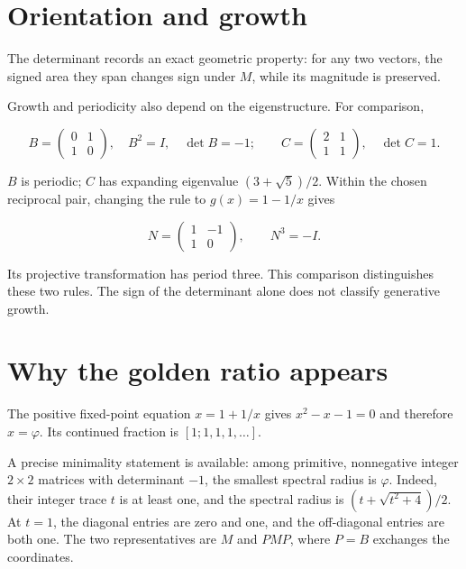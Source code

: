 \documentclass[10pt,a4paper]{article}
\begin{document}
\section*{Orientation and growth}

The determinant records an exact geometric property: for any two vectors, the signed area they span changes sign under $M$, while its magnitude is preserved.
\par

Growth and periodicity also depend on the eigenstructure. For comparison,
\par

\[
B=\begin{pmatrix}0&1\\1&0\end{pmatrix},\quad B^2=I,\quad \det B=-1;\qquad C=\begin{pmatrix}2&1\\1&1\end{pmatrix},\quad \det C=1.
\]

$B$ is periodic; $C$ has expanding eigenvalue $(3+\sqrt5)/2$. Within the chosen reciprocal pair, changing the rule to $g(x)=1-1/x$ gives
\par

\[
N=\begin{pmatrix}1&-1\\1&0\end{pmatrix},\qquad N^3=-I.
\]

Its projective transformation has period three. This comparison distinguishes these two rules. The sign of the determinant alone does not classify generative growth.
\par

\section*{Why the golden ratio appears}

The positive fixed-point equation $x=1+1/x$ gives $x^2-x-1=0$ and therefore $x=\varphi$. Its continued fraction is $[1;1,1,1,\ldots]$.
\par

A precise minimality statement is available: among primitive, nonnegative integer $2\times2$ matrices with determinant $-1$, the smallest spectral radius is $\varphi$. Indeed, their integer trace $t$ is at least one, and the spectral radius is $(t+\sqrt{t^2+4})/2$. At $t=1$, the diagonal entries are zero and one, and the off-diagonal entries are both one. The two representatives are $M$ and $PMP$, where $P=B$ exchanges the coordinates.
\par
\end{document}

